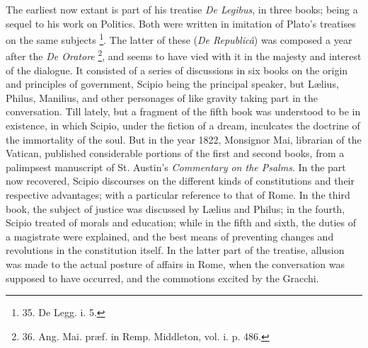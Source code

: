 The earliest now extant is
part of his treatise \emph{De Legibus}, in three books; being a sequel
to his work on Politics. Both were written in imitation of Plato's
treatises on the same subjects \footnote{35. De Legg.
i. 5.}. The latter of these (\emph{De
Republicâ}) was composed a year after the \emph{De Oratore} \footnote{36. Ang. Mai. præf. in Remp.
Middleton, vol. i. p. 486.}, and seems to have vied with it in the majesty and interest of the
dialogue. It consisted of a series of discussions in six books on the
origin and principles of government, Scipio being the principal
speaker, but Lælius, Philus, Manilius, and other personages of like
gravity taking part in the conversation. Till lately, but a fragment
of the fifth book was understood to be in existence, in which Scipio,
under the fiction of a dream, inculcates the doctrine of the
immortality of the soul. But in the year 1822, Monsignor Mai,
librarian of the Vatican, published considerable portions of the first
and second books, from a palimpsest manuscript of St. Austin's \emph{Commentary
on the Psalms}. In the part now recovered, Scipio discourses on the
different kinds of constitutions and their respective advantages; with
a particular reference to that of Rome. In the third book, the subject
of justice was discussed by Lælius and Philus; in the fourth, Scipio
treated of morals and education; while in the fifth and sixth, the
duties of a magistrate were explained, and the best means of
preventing changes and revolutions in the constitution itself. In the
latter part of the treatise, allusion was made to the actual posture
of affairs in Rome, when the conversation was supposed to have
occurred, and the commotions excited by the Gracchi.


